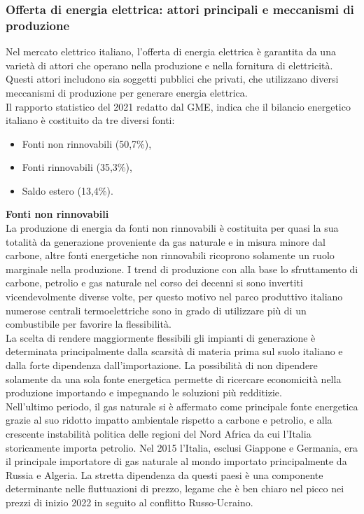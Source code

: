\documentclass{article}
\begin{document}
\subsubsection{Offerta di energia elettrica: attori principali e meccanismi di produzione}
Nel mercato elettrico italiano, l'offerta di energia elettrica è garantita da una varietà di attori che operano nella produzione e nella fornitura di elettricità. Questi attori includono sia soggetti pubblici che privati, che utilizzano diversi meccanismi di produzione per generare energia elettrica.\\
Il rapporto statistico del 2021 redatto dal GME\cite{GSE2021}, indica che il bilancio energetico italiano è costituito da tre diversi fonti:
\begin{itemize}
    \item Fonti non rinnovabili (50,7\%),
    \item Fonti rinnovabili (35,3\%),
    \item Saldo estero (13,4\%).
\end{itemize}
\textbf{Fonti non rinnovabili}\\
La produzione di energia da fonti non rinnovabili è costituita per quasi la sua totalità da generazione proveniente da gas naturale e in misura minore dal carbone, altre fonti energetiche non rinnovabili ricoprono solamente un ruolo marginale nella produzione. I trend di produzione con alla base lo sfruttamento di carbone, petrolio e gas naturale nel corso dei decenni si sono invertiti vicendevolmente diverse volte, per questo motivo nel parco produttivo italiano numerose centrali termoelettriche sono in grado di utilizzare più di un combustibile per favorire la flessibilità. \\
La scelta di rendere maggiormente flessibili gli impianti di generazione è determinata principalmente dalla scarsità di materia prima sul suolo italiano e dalla forte dipendenza dall’importazione. La possibilità di non dipendere solamente da una sola fonte energetica permette di ricercare economicità nella produzione importando e impegnando le soluzioni più redditizie.\\
Nell'ultimo periodo, il gas naturale si è affermato come principale fonte energetica grazie al suo ridotto impatto ambientale rispetto a carbone e petrolio, e alla crescente instabilità politica delle regioni del Nord Africa da cui l'Italia storicamente importa petrolio. Nel 2015 l’Italia, esclusi Giappone e Germania, era il principale importatore di gas naturale al mondo\cite{iea2016} importato principalmente da Russia e Algeria. La stretta dipendenza da questi paesi è una componente determinante nelle fluttuazioni di prezzo, legame che è ben chiaro nel picco nei prezzi di inizio 2022 in seguito al conflitto Russo-Ucraino.\\
\end{document}
